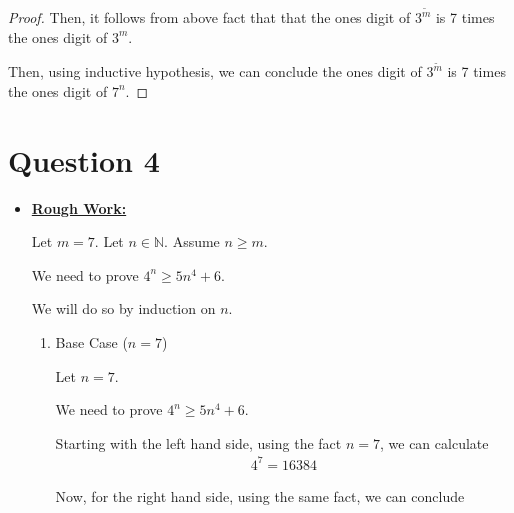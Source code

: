 \documentclass[12pt]{article}
\begin{document}
\begin{itemize}
\begin{mdframed}
\begin{proof}
        \bigskip

        Then, it follows from above fact that that the ones digit of $3^{\tilde{m}}$
        is 7 times the ones digit of $3^m$.

        \bigskip

        Then, using inductive hypothesis, we can conclude the ones digit of $3^{\tilde{m}}$
        is 7 times the ones digit of $7^n$.

        \end{proof}
    \end{mdframed}
\end{itemize}

\section*{Question 4}
\begin{itemize}
    \item

    \begin{mdframed}

        \underline{\textbf{Rough Work:}}

        \bigskip

        Let $m = 7$. Let $n \in \mathbb{N}$. Assume $n \geq m$.

        \bigskip

        We need to prove $4^n \geq 5n^4 + 6$.

        \bigskip

        We will do so by induction on $n$.

        \begin{enumerate}[1.]
            \item Base Case ($n = 7$)

            \begin{mdframed}
            Let $n = 7$.

            \bigskip

            We need to prove $4^n \geq 5n^4 + 6$.

            \bigskip

            Starting with the left hand side, using the fact $n = 7$, we
            can calculate
            \setcounter{equation}{0}
            \begin{align}
                4^7 = 16384
            \end{align}

            \bigskip

            Now, for the right hand side, using the same fact, we can conclude


\end{mdframed}
\end{enumerate}
\end{mdframed}
\end{itemize}
\end{document}
